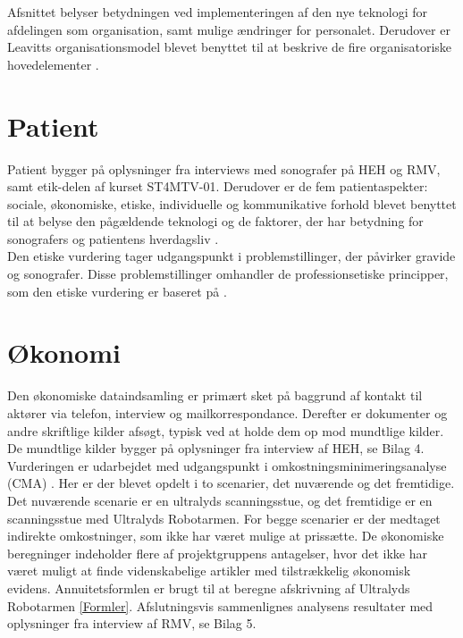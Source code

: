 Afsnittet belyser betydningen ved implementeringen af den nye teknologi for afdelingen som organisation, samt mulige ændringer for personalet. Derudover er Leavitts organisationsmodel blevet benyttet til at beskrive de fire organisatoriske hovedelementer \cite{Leavitt}.

\section{Patient}
Patient bygger på oplysninger fra interviews med sonografer på HEH og RMV, samt etik-delen af kurset ST4MTV-01. Derudover er de fem patientaspekter: sociale, økonomiske, etiske, individuelle og kommunikative forhold blevet benyttet til at belyse den pågældende teknologi og de faktorer, der har betydning for sonografers og patientens hverdagsliv \cite{Leavitt}.\\ 
Den etiske vurdering tager udgangspunkt i problemstillinger, der påvirker gravide og sonografer. Disse problemstillinger omhandler de professionsetiske principper, som den etiske vurdering er baseret på \cite{Husted}\cite{Etiskehjul}.

\section{Økonomi}
Den økonomiske dataindsamling er primært sket på baggrund af kontakt til aktører via telefon, interview og mailkorrespondance. Derefter er dokumenter og andre skriftlige kilder afsøgt, typisk ved at holde dem op mod mundtlige kilder. De mundtlige kilder bygger på oplysninger fra interview af HEH, se Bilag 4. Vurderingen er udarbejdet med udgangspunkt i omkostningsminimeringsanalyse (CMA) \cite{Leavitt}. Her er der blevet opdelt i to scenarier, det nuværende og det fremtidige. Det nuværende scenarie er en ultralyds scanningsstue, og det fremtidige er en scanningsstue med Ultralyds Robotarmen. For begge scenarier er der medtaget indirekte omkostninger, som ikke har været mulige at prissætte. De økonomiske beregninger indeholder flere af projektgruppens antagelser, hvor det ikke har været muligt at finde videnskabelige artikler med tilstrækkelig økonomisk evidens. Annuitetsformlen er brugt til at beregne afskrivning af Ultralyds Robotarmen \ref{Formler}. Afslutningsvis sammenlignes analysens resultater med oplysninger fra interview af RMV, se Bilag 5. 